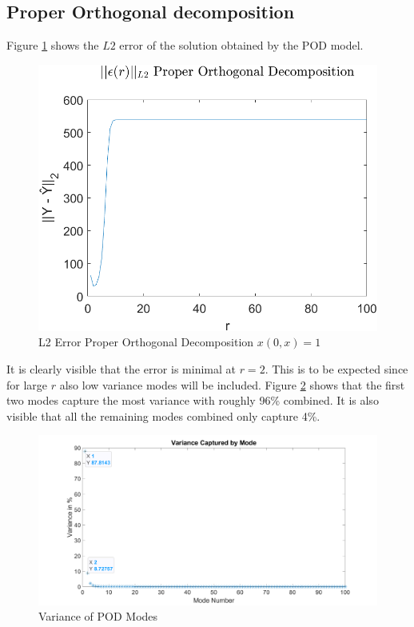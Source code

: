 \subsection{Proper Orthogonal decomposition}
Figure \ref{FIG-ERR-POD} shows the \(L2\) error of the solution obtained by the POD model.
\begin{figure}[H]
\centering
\includegraphics[width=12.5cm]{images/L2_POD}
\caption{L2 Error Proper Orthogonal Decomposition $x(0, x) = 1$}
\label{FIG-ERR-POD}
\end{figure}
It is clearly visible that the error is minimal at  \(r=2\).
This is to be expected since for large \(r\) also low variance modes will be included.
Figure \ref{FIG-POD-VAR} shows that the first two modes capture the most variance with roughly 96\% combined.
It is also visible that all the remaining modes combined only capture 4\%.
\begin{figure}[H]
\centering
\includegraphics[width=12.5cm]{images/test_modes_pod}
\caption{Variance of POD Modes}
\label{FIG-POD-VAR}
\end{figure}
